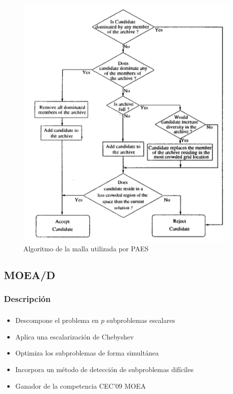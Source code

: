 \documentclass[serif]{beamer}
\begin{document}
\begin{frame}
\frametitle{\insertsubsubsection}
	\vspace*{-0.2cm}
	\begin{figure}
	\centering
	\includegraphics[height=0.9\textheight]{paes2.png}
	\caption{Algoritmo de la malla utilizada por PAES}
	\end{figure}
\end{frame}

	
\subsection{MOEA/D}
\subsubsection{Descripción}
\begin{frame}
\frametitle{\insertsubsubsection}
	\begin{itemize}\setlength{\itemsep}{4mm}
		\item Descompone el problema en $p$ subproblemas escalares
		\item Aplica una escalarización de Chebyshev
		\item Optimiza los subproblemas de forma simultánea
		\item Incorpora un método de detección de subproblemas difíciles
		\item Ganador de la competencia CEC’09 MOEA
	\end{itemize}
\end{frame}
\end{document}
